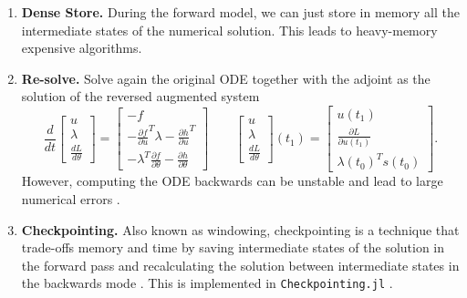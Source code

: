 \begin{enumerate}[label=(\roman*)]
    \item \textbf{Dense Store.} During the forward model, we can just store in memory all the intermediate states of the numerical solution. 
    This leads to heavy-memory expensive algorithms. 
    \item \textbf{Re-solve.} Solve again the original ODE together with the adjoint as the solution of the reversed augmented system \cite{chen_neural_2019}
    \begin{equation}
    \frac{d}{dt}
    \begin{bmatrix}
       u \\
       \lambda \\
       \frac{dL}{d\theta}
    \end{bmatrix}
    = 
    \begin{bmatrix}
       -f \\
       - \frac{\partial f}{\partial u}^T \lambda - \frac{\partial h}{\partial u}^T \\
       - \lambda^T \frac{\partial f}{\partial \theta} - \frac{\partial h}{\partial \theta}
    \end{bmatrix}
    \qquad 
    \begin{bmatrix}
       u \\
       \lambda \\
       \frac{dL}{d\theta}
    \end{bmatrix}(t_1)
    = 
    \begin{bmatrix}
       u(t_1) \\
       \frac{\partial L}{\partial u(t_1)} \\
       \lambda(t_0)^T s(t_0)
    \end{bmatrix}.
    \end{equation}
    However, computing the ODE backwards can be unstable and lead to large numerical errors \cite{kim_stiff_2021, Zhuang_2020}. 
    \item \textbf{Checkpointing. } Also known as windowing, checkpointing is a technique that trade-offs memory and time by saving intermediate states of the solution in the forward pass and recalculating the solution between intermediate states in the backwards mode \cite{Checkpoiting_2023, griewank2008evaluatingderivatives}. 
    This is implemented in \texttt{Checkpointing.jl} \cite{Checkpoiting_2023}.
\end{enumerate} 

